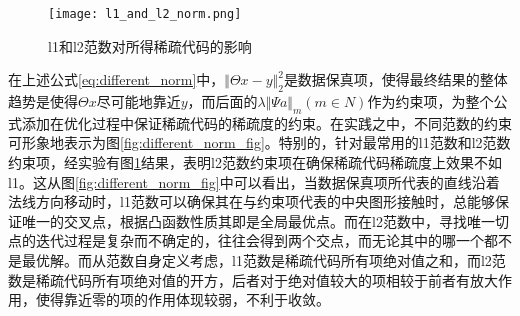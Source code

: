 \begin{figure}[ht]
  \centering
  \texttt{[image: l1\_and\_l2\_norm.png]}
  \caption{l1和l2范数对所得稀疏代码的影响}
  \label{fig:l1_and_l2_norm}
\end{figure}
在上述公式\ref{eq:different_norm}中，$\Vert \Theta x - y \Vert_2^2$是数据保真项，使得最终结果的整体趋势是使得$\Theta x$尽可能地靠近$y$，而后面的$\lambda \Vert \Psi a \Vert_m(m\in N)$作为约束项，为整个公式添加在优化过程中保证稀疏代码的稀疏度的约束。在实践之中，不同范数的约束可形象地表示为图\ref{fig:different_norm_fig}。特别的，针对最常用的l1范数和l2范数约束项，经实验有图\ref{fig:l1_and_l2_norm}结果，表明l2范数约束项在确保稀疏代码稀疏度上效果不如l1。这从图\ref{fig:different_norm_fig}中可以看出，当数据保真项所代表的直线沿着法线方向移动时，l1范数可以确保其在与约束项代表的中央图形接触时，总能够保证唯一的交叉点，根据凸函数性质其即是全局最优点。而在l2范数中，寻找唯一切点的迭代过程是复杂而不确定的，往往会得到两个交点，而无论其中的哪一个都不是最优解。而从范数自身定义考虑，l1范数是稀疏代码所有项绝对值之和，而l2范数是稀疏代码所有项绝对值的开方，后者对于绝对值较大的项相较于前者有放大作用，使得靠近零的项的作用体现较弱，不利于收敛。
